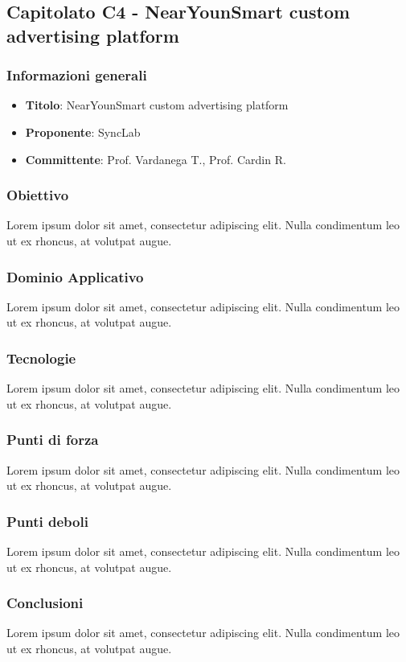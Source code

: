 \subsection{Capitolato C4 - NearYounSmart custom advertising platform}
     \subsubsection{Informazioni generali}
        \begin{itemize}
            \item \textbf{Titolo}: NearYounSmart custom advertising platform
            \item \textbf{Proponente}: SyncLab
            \item \textbf{Committente}: Prof. Vardanega T., Prof. Cardin R.
        \end{itemize}
     \subsubsection{Obiettivo}
    Lorem ipsum dolor sit amet, consectetur adipiscing elit. Nulla condimentum leo ut ex rhoncus, at volutpat augue.
     \subsubsection{Dominio Applicativo}
    Lorem ipsum dolor sit amet, consectetur adipiscing elit. Nulla condimentum leo ut ex rhoncus, at volutpat augue.
    \subsubsection{Tecnologie}
    Lorem ipsum dolor sit amet, consectetur adipiscing elit. Nulla condimentum leo ut ex rhoncus, at volutpat augue.
    \subsubsection{Punti di forza}
    Lorem ipsum dolor sit amet, consectetur adipiscing elit. Nulla condimentum leo ut ex rhoncus, at volutpat augue.
    \subsubsection{Punti deboli}
    Lorem ipsum dolor sit amet, consectetur adipiscing elit. Nulla condimentum leo ut ex rhoncus, at volutpat augue.
    \subsubsection{Conclusioni}
    Lorem ipsum dolor sit amet, consectetur adipiscing elit. Nulla condimentum leo ut ex rhoncus, at volutpat augue.